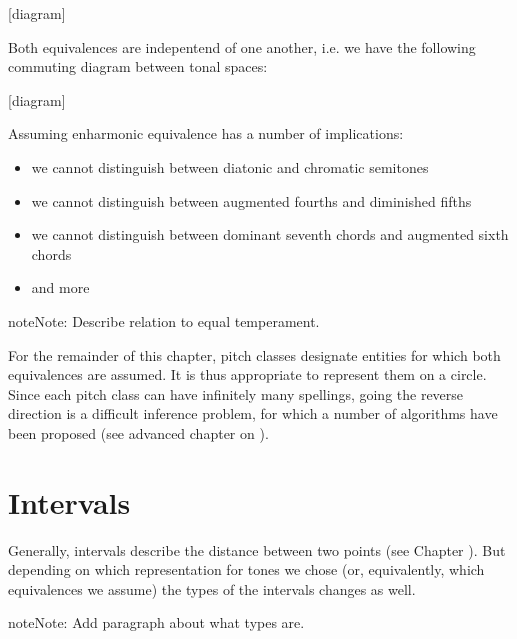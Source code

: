 \documentclass[letterpaper,10pt,english]{sphinxmanual}
\begin{document}
{[}diagram{]}

Both equivalences are indepentend of one another, i.e. we have the following commuting diagram between tonal spaces:

{[}diagram{]}

Assuming enharmonic equivalence has a number of implications:
\begin{itemize}
\item {} 
we cannot distinguish between diatonic and chromatic semitones

\item {} 
we cannot distinguish between augmented fourths and diminished fifths

\item {} 
we cannot distinguish between dominant seventh chords and augmented sixth chords

\item {} 
and more

\end{itemize}

\begin{sphinxadmonition}{note}{Note:}
Describe relation to equal temperament.
\end{sphinxadmonition}

For the remainder of this chapter, pitch classes designate entities for which both equivalences are assumed.
It is thus appropriate to represent them on a circle. Since each pitch class can have infinitely many spellings,
going the reverse direction is a difficult inference problem, for which a number of algorithms have been proposed
(see advanced chapter on {\hyperref[\detokenize{6_advanced:pitch-spelling}]{}}).


\section{Intervals}
\label{\detokenize{3_set_theory:intervals}}
Generally, intervals describe the distance between two points (see Chapter {\hyperref[\detokenize{1_fundamentals:intervals}]{}}).
But depending on which representation for tones we chose (or, equivalently, which equivalences we assume)
the types of the intervals changes as well.

\begin{sphinxadmonition}{note}{Note:}
Add paragraph about what types are.
\end{sphinxadmonition}
\end{document}
